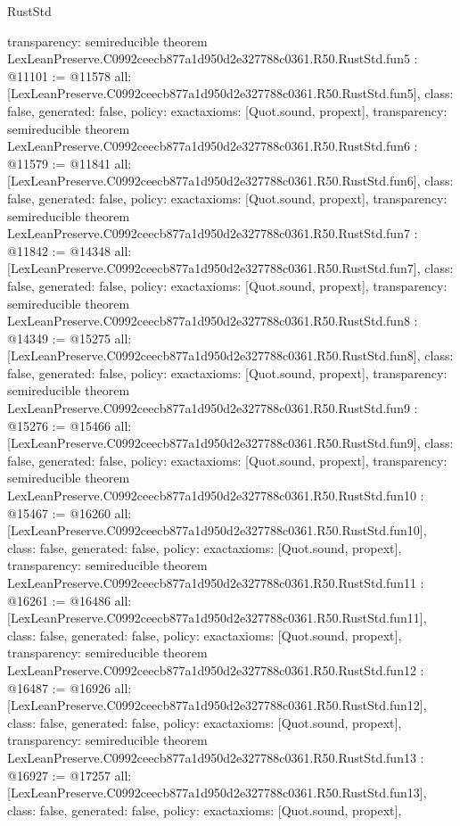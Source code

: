\begin{lexlean}{RustStd}
\begin{coremodule}
{  transparency: semireducible
}
theorem LexLeanPreserve.C0992ceecb877a1d950d2e327788c0361.R50.RustStd.fun5 : @11101 := @11578 {
  all: [LexLeanPreserve.C0992ceecb877a1d950d2e327788c0361.R50.RustStd.fun5],
  class: false,
  generated: false,
  policy: exact{axioms: [Quot.sound, propext]},
  transparency: semireducible
}
theorem LexLeanPreserve.C0992ceecb877a1d950d2e327788c0361.R50.RustStd.fun6 : @11579 := @11841 {
  all: [LexLeanPreserve.C0992ceecb877a1d950d2e327788c0361.R50.RustStd.fun6],
  class: false,
  generated: false,
  policy: exact{axioms: [Quot.sound, propext]},
  transparency: semireducible
}
theorem LexLeanPreserve.C0992ceecb877a1d950d2e327788c0361.R50.RustStd.fun7 : @11842 := @14348 {
  all: [LexLeanPreserve.C0992ceecb877a1d950d2e327788c0361.R50.RustStd.fun7],
  class: false,
  generated: false,
  policy: exact{axioms: [Quot.sound, propext]},
  transparency: semireducible
}
theorem LexLeanPreserve.C0992ceecb877a1d950d2e327788c0361.R50.RustStd.fun8 : @14349 := @15275 {
  all: [LexLeanPreserve.C0992ceecb877a1d950d2e327788c0361.R50.RustStd.fun8],
  class: false,
  generated: false,
  policy: exact{axioms: [Quot.sound, propext]},
  transparency: semireducible
}
theorem LexLeanPreserve.C0992ceecb877a1d950d2e327788c0361.R50.RustStd.fun9 : @15276 := @15466 {
  all: [LexLeanPreserve.C0992ceecb877a1d950d2e327788c0361.R50.RustStd.fun9],
  class: false,
  generated: false,
  policy: exact{axioms: [Quot.sound, propext]},
  transparency: semireducible
}
theorem LexLeanPreserve.C0992ceecb877a1d950d2e327788c0361.R50.RustStd.fun10 : @15467 := @16260 {
  all: [LexLeanPreserve.C0992ceecb877a1d950d2e327788c0361.R50.RustStd.fun10],
  class: false,
  generated: false,
  policy: exact{axioms: [Quot.sound, propext]},
  transparency: semireducible
}
theorem LexLeanPreserve.C0992ceecb877a1d950d2e327788c0361.R50.RustStd.fun11 : @16261 := @16486 {
  all: [LexLeanPreserve.C0992ceecb877a1d950d2e327788c0361.R50.RustStd.fun11],
  class: false,
  generated: false,
  policy: exact{axioms: [Quot.sound, propext]},
  transparency: semireducible
}
theorem LexLeanPreserve.C0992ceecb877a1d950d2e327788c0361.R50.RustStd.fun12 : @16487 := @16926 {
  all: [LexLeanPreserve.C0992ceecb877a1d950d2e327788c0361.R50.RustStd.fun12],
  class: false,
  generated: false,
  policy: exact{axioms: [Quot.sound, propext]},
  transparency: semireducible
}
theorem LexLeanPreserve.C0992ceecb877a1d950d2e327788c0361.R50.RustStd.fun13 : @16927 := @17257 {
  all: [LexLeanPreserve.C0992ceecb877a1d950d2e327788c0361.R50.RustStd.fun13],
  class: false,
  generated: false,
  policy: exact{axioms: [Quot.sound, propext]},
}
\end{coremodule}
\end{lexlean}
